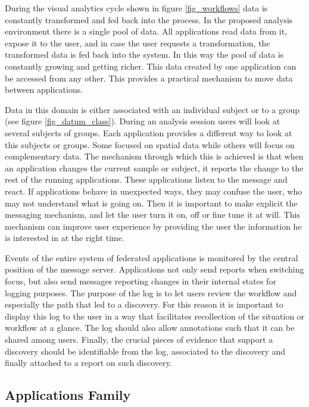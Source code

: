 During the visual analytics cycle shown in figure \ref{fig_workflows} data is constantly transformed and fed back into the process. In the proposed analysis environment there is a single pool of data. All applications read data from it, expose it to the user, and in case the user requests a transformation, the transformed data is fed back into the system. In this way the pool of data is constantly growing and getting richer. This data created by one application can be accessed from any other. This provides a practical mechanism to move data between applications. 

Data in this domain is either associated with an individual subject or to a group (see figure \ref{fig_datum_class}). During an analysis session users will look at several subjects of groups. Each application provides a different way to look at this subjects or groups. Some focused on spatial data while others will focus on complementary data. The mechanism through which this is achieved is that when an application changes the current sample or subject, it reports the change to the rest of the running applications. These applications listen to the message and react. If applications behave in unexpected ways, they may confuse the user, who may not understand what is going on. Then it is important to make explicit the messaging mechanism, and let the user turn it on, off or fine tune it at will. This mechanism can improve user experience by providing the user the information he is interested in at the right time.

 Events of the entire system of federated applications is monitored by the central position of the message server. Applications not only send reports when switching focus, but also send messages reporting changes in their internal states  for logging purposes. The purpose of the log is to let users review the workflow and especially the path that led to a discovery. For this reason it is important to display this log to the user in a way that facilitates recollection of the situation or workflow at a glance. The log should also allow annotations such that it can be shared among users. Finally, the crucial pieces of evidence that support a discovery should be identifiable from the log, associated to the discovery and finally attached to a report on such discovery.



%


\subsection{Applications Family}

